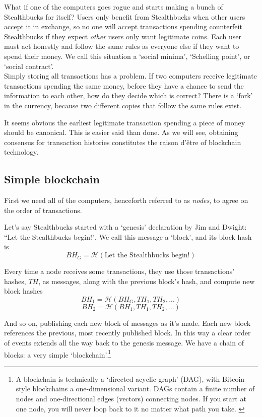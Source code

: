 What if one of the computers goes rogue and starts making a bunch of Stealthbucks for itself? Users only benefit from Stealthbucks when other users accept it in exchange, so no one will accept transactions spending counterfeit Stealthbucks if they expect {\em other} users only want legitimate coins. Each user must act honestly and follow the same rules as everyone else if they want to spend their money. We call this situation a `social minima', `Schelling point', or `social contract'.\\


Simply storing all transactions has a problem. If two computers receive legitimate transactions spending the same money, before they have a chance to send the information to each other, how do they decide which is correct? There is a `fork' in the currency, because two different copies that follow the same rules exist.

It seems obvious the earliest legitimate transaction spending a piece of money should be canonical. This is easier said than done. As we will see, obtaining consensus for transaction histories constitutes the raison d'\^{e}tre of blockchain technology.


\subsection{Simple blockchain}
\label{subsec:simple-blockchain}

First we need all of the computers, henceforth referred to as {\em nodes}, to agree on the order of transactions.

Let's say Stealthbucks started with a `genesis' declaration by Jim and Dwight: ``Let the Stealthbucks begin!". We call this message a `block', and its block hash is \vspace{.2cm}
\[ \mathit{BH}_G = \mathcal{H}(\textrm{Let the Stealthbucks begin!}) \]

Every time a node receives some transactions, they use those transactions' hashes, $\mathit{TH}$, as messages, along with the previous block's hash, and compute new block hashes\vspace{.2cm}
\[ \mathit{BH}_1 = \mathcal{H}(\mathit{BH}_G, \mathit{TH}_1, \mathit{TH}_2,...) \]
\[ \mathit{BH}_2 = \mathcal{H}(\mathit{BH}_1, \mathit{TH}_1, \mathit{TH}_2,...) \]

And so on, publishing each new block of messages as it's made. Each new block references the previous, most recently published block. In this way a clear order of events extends all the way back to the genesis message. We have a chain of blocks: a very simple `blockchain'.\footnote{A blockchain is technically a `directed acyclic graph' (DAG), with Bitcoin-style blockchains a one-dimensional variant. DAGs contain a finite number of nodes and one-directional edges (vectors) connecting nodes. If you start at one node, you will never loop back to it no matter what path you take. \cite{DAG-wikipedia}}

